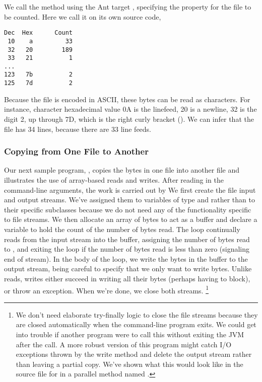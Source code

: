 We call the method using the Ant target , 
specifying the  property for the file to be counted. 
Here we call it on its own source code,
%
\begin{verbatim}
Dec  Hex      Count
 10    a         33
 32   20        189
 33   21          1
...
123   7b          2
125   7d          2
\end{verbatim}
%
Because the file is encoded in ASCII, these bytes can be read as
characters.  For instance, character hexadecimal value 0A is the
linefeed, 20 is a newline, 32 is the digit 2, up through 7D, which is
the right curly bracket (\code{\}}).  We can infer that the file has
34 lines, because there are 33 line feeds.  

\subsubsection{Copying from One File to Another}\label{section:io-copy-file}

Our next sample program, , copies the bytes in one file
into another file and illustrates the use of array-based reads and writes.
After reading in the command-line arguments, the work is carried out by
%
%
We first create the file input and output streams.  We've assigned
them to variables of type  and 
rather than to their specific subclasses because we do not need any of
the functionality specific to file streams.  We then allocate an array
 of bytes to act as a buffer and declare a variable  to hold
the count of the number of bytes read.  The loop continually reads
from the input stream into the buffer, assigning the number of bytes
read to , and exiting the loop if the number of bytes read is
less than zero (signaling end of stream).  In the body of the loop, we
write the bytes in the buffer to the output stream, being careful to
specify that we only want to write  bytes.  Unlike reads,
writes either succeed in writing all their bytes (perhaps having to
block), or throw an exception.  When we're done, we close both streams.%
%
\footnote{We don't need elaborate try-finally logic to close
the file streams because they are closed automatically when the
command-line program exits.  We could get into trouble if another
program were to call this  without exiting the JVM after
the call.  A more robust version of this program might catch I/O
exceptions thrown by the write method and delete the output stream
rather than leaving a partial copy.  We've shown what this would look
like in the source file for  in a parallel method
named .}

